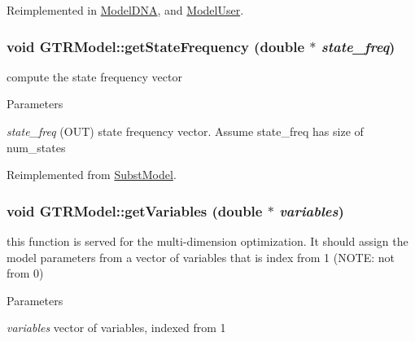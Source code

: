 Reimplemented in \hyperlink{classModelDNA_adc73fda51fb0f02049ed891b29c3a951}{ModelDNA}, and \hyperlink{classModelUser_ad5a88a6c25475b8bb0ea778f4c40cf3b}{ModelUser}.\hypertarget{classGTRModel_aa7cdd1fb6852faccc185284c075c918b}{
\subsubsection[{getStateFrequency}]{\setlength{\rightskip}{0pt plus 5cm}void GTRModel::getStateFrequency (double $\ast$ {\em state\_\-freq})}}
\label{classGTRModel_aa7cdd1fb6852faccc185284c075c918b}
compute the state frequency vector 
\begin{DoxyParams}{Parameters}
\item[{\em state\_\-freq}](OUT) state frequency vector. Assume state\_\-freq has size of num\_\-states \end{DoxyParams}


Reimplemented from \hyperlink{classSubstModel_a18f98e25cacbd18e1b64b25d10a3e11f}{SubstModel}.\hypertarget{classGTRModel_ae0d291e293dd142d41466650539a2481}{
\subsubsection[{getVariables}]{\setlength{\rightskip}{0pt plus 5cm}void GTRModel::getVariables (double $\ast$ {\em variables})}}
\label{classGTRModel_ae0d291e293dd142d41466650539a2481}
this function is served for the multi-\/dimension optimization. It should assign the model parameters from a vector of variables that is index from 1 (NOTE: not from 0) 
\begin{DoxyParams}{Parameters}
\item[{\em variables}]vector of variables, indexed from 1 \end{DoxyParams}


